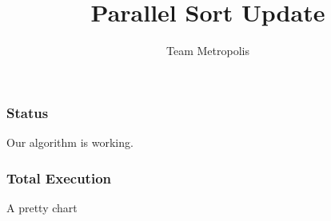 \documentclass[10pt, compress, usenames,dvipsnames]{beamer}
\title{Parallel Sort Update}
\subtitle{Team Metropolis}
\author{}
\institute{Middle Tennessee State University}
\begin{document}
\maketitle


%
%

\begin{frame}[fragile]
\frametitle{Status}

Our algorithm is working.


\end{frame}

%
%

\begin{frame}[fragile]
\frametitle{Total Execution}

A pretty chart


\end{frame}
\end{document}

